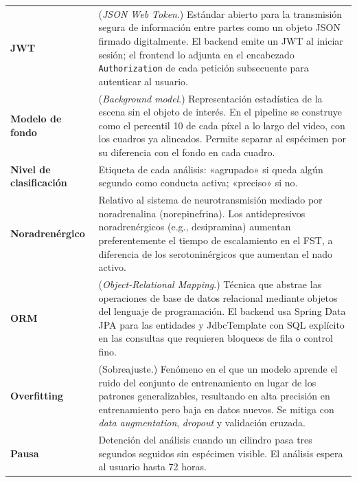 \begin{longtable}{@{} p{4.0cm} p{10.9cm} @{}}
  \textbf{JWT}
  & (\textit{JSON Web Token}.) Estándar abierto para la transmisión
    segura de información entre partes como un objeto JSON firmado digitalmente.
    El backend emite un JWT al iniciar sesión; el frontend lo adjunta en el
    encabezado \texttt{Authorization} de cada petición subsecuente para
    autenticar al usuario. \\[5pt]

  \textbf{Modelo de fondo}
  & (\textit{Background model}.) Representación estadística de la escena sin el
    objeto de interés. En el pipeline se construye como el percentil 10 de cada
    píxel a lo largo del video, con los cuadros ya alineados. Permite separar al
    espécimen por su diferencia con el fondo en cada cuadro. \\[5pt]

  \textbf{Nivel de clasificación}
  & Etiqueta de cada análisis: «agrupado» si queda algún segundo como conducta activa; «preciso» si no. \\[5pt]

  \textbf{Noradrenérgico}
  & Relativo al sistema de neurotransmisión mediado por noradrenalina (norepinefrina).
    Los antidepresivos noradrenérgicos (e.g., desipramina) aumentan
    preferentemente el tiempo de escalamiento en el FST, a diferencia de los
    serotoninérgicos que aumentan el nado activo. \\[5pt]

  \textbf{ORM}
  & (\textit{Object-Relational Mapping}.) Técnica que abstrae las operaciones de
    base de datos relacional mediante objetos del lenguaje de programación. El
    backend usa Spring Data JPA para las entidades y JdbcTemplate con SQL explícito en las
    consultas que requieren bloqueos de fila o control fino. \\[5pt]

  \textbf{Overfitting}
  & (Sobreajuste.) Fenómeno en el que un modelo aprende el ruido del conjunto de
    entrenamiento en lugar de los patrones generalizables, resultando en alta
    precisión en entrenamiento pero baja en datos nuevos. Se mitiga con \textit{data
    augmentation}, \textit{dropout} y validación cruzada. \\[5pt]

  \textbf{Pausa}
  & Detención del análisis cuando un cilindro pasa tres segundos seguidos sin espécimen visible. El análisis espera al usuario hasta 72 horas. \\[5pt]


\end{longtable}
